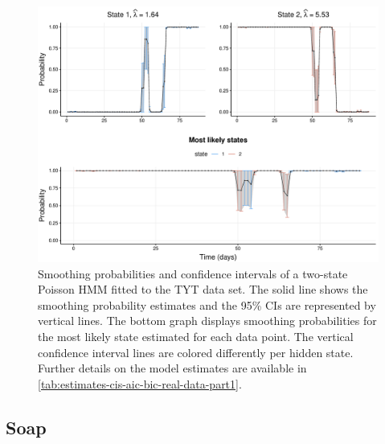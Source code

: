 \documentclass[]{interact}\usepackage[]{graphicx}\usepackage[dvipsnames]{xcolor}
\makeatletter
\def\maxwidth{ %
  \ifdim\Gin@nat@width>\linewidth
    \linewidth
  \else
    \Gin@nat@width
  \fi
}
\newenvironment{knitrout}{}{} %
\theoremstyle{plain}%
\theoremstyle{definition}
\theoremstyle{remark}
\makeatother
\begin{document}
\begin{knitrout}
\color{fgcolor}\begin{figure}[!htb]

{\centering \includegraphics[width=\maxwidth]{figure/smoothing-tinn-1} 

}

\caption{Smoothing probabilities and confidence intervals of a two-state Poisson HMM fitted to the TYT data set. The solid line shows the smoothing probability estimates and the 95\% CIs are represented by vertical lines. The bottom graph displays smoothing probabilities for the most likely state estimated for each data point. The vertical confidence interval lines are colored differently per hidden state. Further details on the model estimates are available in \autoref{tab:estimates-cis-aic-bic-real-data-part1}.}\label{fig:smoothing-tinn}
\end{figure}

\end{knitrout}

\subsection{Soap}
\label{sec:sm-soap}
\end{document}
